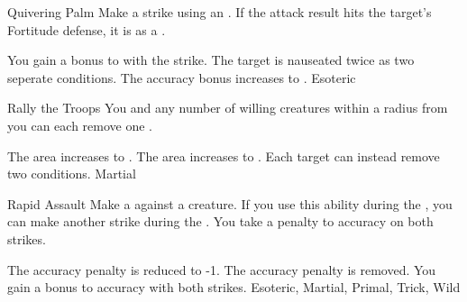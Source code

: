 \lowercase{\hypertarget{maneuver:Quivering Palm}{}}\label{maneuver:Quivering Palm}
\begin{apability}{\hypertarget{maneuver:Quivering Palm}{Quivering Palm}}
Make a strike using an .
If the attack result hits the target's Fortitude defense,
it is  as a .

\rankline
{} You gain a  bonus to  with the strike.
 The target is nauseated twice as two seperate conditions.
 The accuracy bonus increases to .
 Esoteric
\end{apability}
\vspace{0.25em}



\lowercase{\hypertarget{maneuver:Rally the Troops}{}}\label{maneuver:Rally the Troops}
\begin{apability}{\hypertarget{maneuver:Rally the Troops}{Rally the Troops}}
You and any number of willing creatures within a \areamed radius from you
can each remove one .

\rankline
{} The area increases to \arealarge.
 The area increases to \areahuge.
 Each target can instead remove two conditions.
 Martial
\end{apability}
\vspace{0.25em}



\lowercase{\hypertarget{maneuver:Rapid Assault}{}}\label{maneuver:Rapid Assault}
\begin{apability}{\hypertarget{maneuver:Rapid Assault}{Rapid Assault}}
Make a  against a creature.
If you use this ability during the , you can make another strike during the .
You take a  penalty to accuracy on both strikes.

\rankline
{} The accuracy penalty is reduced to -1.
 The accuracy penalty is removed.
 You gain a  bonus to accuracy with both strikes.
 Esoteric, Martial, Primal, Trick, Wild
\end{apability}
\vspace{0.25em}



